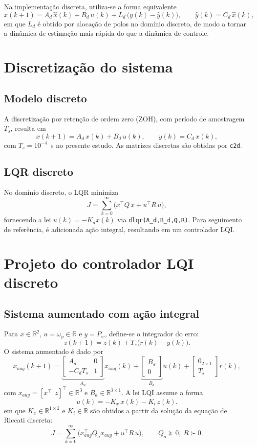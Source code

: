Na implementação discreta, utiliza-se a forma equivalente
\[
    \hat{x}(k+1)=A_d\,\hat{x}(k)+B_d\,u(k)+L_d\,\big(y(k)-\hat{y}(k)\big),\qquad \hat{y}(k)=C_d\,\hat{x}(k),
\]
em que $L_d$ é obtido por alocação de polos no domínio discreto, de modo a tornar a dinâmica de estimação mais rápida do que a dinâmica de controle.
\section{Discretização do sistema}
\label{sec:discretizacao-sistema}
\subsection{Modelo discreto}
\label{sec:modelo-discreto}
A discretização por retenção de ordem zero (ZOH), com período de amostragem $T_s$, resulta em
\[
    x(k+1)=A_d\,x(k)+B_d\,u(k),\qquad y(k)=C_d\,x(k),
\]
com $T_s=10^{-4}$~s no presente estudo. As matrizes discretas são obtidas por \texttt{c2d}.
\subsection{LQR discreto}
\label{sec:projeto-lqr-discreto}
No domínio discreto, o LQR minimiza
\[
    J=\sum_{k=0}^{\infty} \big(x^\top Q\,x + u^\top R\,u\big),
\]
fornecendo a lei $u(k)=-K_d x(k)$ via \texttt{dlqr(A\_d,B\_d,Q,R)}. Para seguimento de referência, é adicionada ação integral, resultando em um controlador LQI.
\section{Projeto do controlador LQI discreto}
\label{sec:controle-lqi-discreto}
\subsection{Sistema aumentado com ação integral}
\label{sec:lqi-mimo}
Para $x\in\mathbb{R}^2$, $u=\omega_p\in\mathbb{R}$ e $y=P_w$, define-se o integrador do erro:
\[
    z(k+1)=z(k)+T_s\big(r(k)-y(k)\big).
\]
O sistema aumentado é dado por
\[
    x_{aug}(k+1)=
    \underbrace{\begin{bmatrix}
            A_d     & 0 \\
            -C_d T_s & 1
        \end{bmatrix}}_{A_a}
    x_{aug}(k)
    +
    \underbrace{\begin{bmatrix}
            B_d \\
            0
        \end{bmatrix}}_{B_a}
    u(k)
    +
    \begin{bmatrix}
        0_{2\times 1} \\
        T_s
    \end{bmatrix}r(k),
\]
com $x_{aug}=[x^\top\ \ z]^\top\in\mathbb{R}^3$ e $B_a\in\mathbb{R}^{3\times 1}$. A lei LQI assume a forma
\[
    u(k)=-K_x\,x(k)-K_i\,z(k).
\]
em que $K_x\in\mathbb{R}^{1\times 2}$ e $K_i\in\mathbb{R}$ são obtidos a partir da solução da equação de Riccati discreta:
\[
    J=\sum_{k=0}^{\infty}\big(x_{aug}^\top Q_a x_{aug}+u^\top R\,u\big),\qquad
    Q_a\succeq 0,\ R\succ 0.
\]
